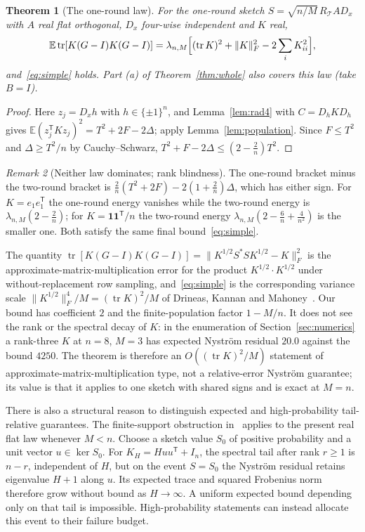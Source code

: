 \documentclass[11pt,a4paper]{article}
\newtheorem{theorem}{Theorem}[section]
\theoremstyle{definition}
\theoremstyle{remark}
\newtheorem{remark}[theorem]{Remark}
\numberwithin{equation}{section}
\newcommand{\E}{\mathbb E}
\newcommand{\tr}{\operatorname{tr}}
\newcommand{\norm}[1]{\lVert#1\rVert}
\newcommand{\cT}{\mathcal T}
\begin{document}
\begin{theorem}[The one-round law]\label{thm:oneround}
For the one-round sketch $S=\sqrt{n/M}\,R_\cT AD_x$ with $A$ real flat
orthogonal, $D_x$ four-wise independent and $K$ real,
\[
 \E\tr[K(G-I)K(G-I)]=\lambda_{n,M}\Bigl[(\tr K)^2+\norm K_F^2-2\sum_iK_{ii}^2\Bigr],
\]
and~\eqref{eq:simple} holds. Part (a) of Theorem~\ref{thm:whole} also covers
this law (take $B=I$).
\end{theorem}
\begin{proof}
Here $z_j=D_xh$ with $h\in\{\pm1\}^n$, and Lemma~\ref{lem:rad4} with
$C=D_hKD_h$ gives $\E(z_j^{\mathsf T}Kz_j)^2=T^2+2F-2\Delta$; apply
Lemma~\ref{lem:population}. Since $F\le T^2$ and $\Delta\ge T^2/n$ by
Cauchy--Schwarz, $T^2+F-2\Delta\le(2-\frac2n)T^2$.
\end{proof}

\begin{remark}[Neither law dominates; rank blindness]\label{rem:blind}
The one-round bracket minus the two-round bracket is
$\frac2n(T^2+2F)-2(1+\frac2n)\Delta$, which has either sign. For $K=e_1e_1^{\mathsf T}$
the one-round energy vanishes while the two-round energy is
$\lambda_{n,M}(2-\frac2n)$; for $K=\mathbf 1\mathbf 1^{\mathsf T}/n$ the two-round
energy $\lambda_{n,M}(2-\frac6n+\frac4{n^2})$ is the smaller one. Both satisfy the same
final bound~\eqref{eq:simple}.

The quantity $\tr[K(G-I)K(G-I)]=\norm{K^{1/2}S^*SK^{1/2}-K}_F^2$ is the
approximate-matrix-multiplication error for the product $K^{1/2}\cdot K^{1/2}$
under without-replacement row sampling, and~\eqref{eq:simple} is the
corresponding variance scale $\norm{K^{1/2}}_F^4/M=(\tr K)^2/M$ of Drineas,
Kannan and Mahoney~\cite{DKM}. Our bound has coefficient $2$ and the
finite-population factor $1-M/n$. It
does not see the rank or the spectral decay of $K$: in the enumeration of
Section~\ref{sec:numerics} a rank-three $K$ at $n=8$, $M=3$ has expected
Nystr\"om residual $20.0$ against the bound $4250$. The theorem is therefore an
$O((\tr K)^2/M)$ statement of approximate-matrix-multiplication type, not a relative-error
Nystr\"om guarantee; its value is that it applies to one sketch with shared
signs and is exact at $M=n$.

There is also a structural reason to distinguish expected and
high-probability tail-relative guarantees. The finite-support obstruction
in~\cite[proposition on expected tail-relative guarantees]{SparseCompanion}
applies to the present real flat law whenever $M<n$.
Choose a sketch value $S_0$ of positive probability and a unit vector
$u\in\ker S_0$. For $K_H=Huu^{\mathsf T}+I_n$, the spectral tail after
rank $r\ge1$ is $n-r$, independent of $H$, but on the event $S=S_0$ the
Nystr\"om residual retains eigenvalue $H+1$ along $u$. Its expected trace
and squared Frobenius norm therefore grow without bound as $H\to\infty$.
A uniform expected bound depending only on that tail is impossible.
High-probability statements can instead allocate this event to their
failure budget.
\end{remark}
\end{document}
